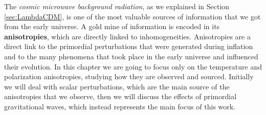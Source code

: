 The \emph{cosmic microwave background radiation}, as we explained in Section \ref{sec:LambdaCDM}, is one of the most valuable sources of information that we got from the early universe. A gold mine of information is encoded in its \textbf{anisotropies}, which are directly linked to inhomogeneities. Anisotropies are a direct link to the primordial perturbations that were generated during inflation and to the many phenomena that took place in the early universe and influenced their evolution. In this chapter we are going to focus only on the temperature and polarization anisotropies, studying how they are observed and sourced. Initially we will deal with scalar perturbations, which are the main source of the anisotropies that we observe, then we will discuss the effects of primordial gravitational waves, which instead represents the main focus of this work. 
